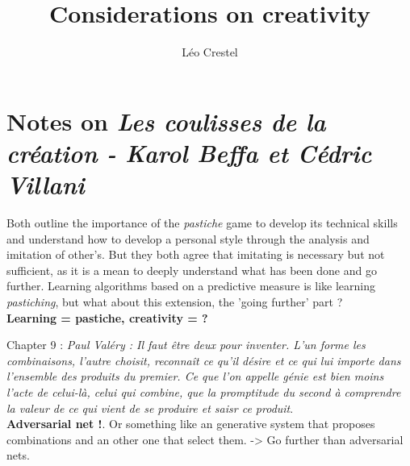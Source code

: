 \documentclass{report}
\title{Considerations on creativity}
\author{Léo Crestel}
\begin{document}
\maketitle

\section{Notes on \textit{Les coulisses de la création - Karol Beffa et Cédric Villani} \cite{Karol-Beffa:2015aa}}
Both outline the importance of the \textit{pastiche} game to develop its technical skills and understand how to develop a personal style through the analysis and imitation of other's.
But they both agree that imitating is necessary but not sufficient, as it is a mean to deeply understand what has been done and go further. Learning algorithms based on a predictive measure is like learning \textit{pastiching}, but what about this extension, the 'going further' part ?
\\
\textbf{ Learning = pastiche, creativity = ?}

Chapter 9 : \textit{Paul Valéry : Il faut être deux pour inventer. L'un forme les combinaisons, l'autre choisit, reconnaît ce qu'il désire et ce qui lui importe dans l'ensemble des produits du premier. Ce que l'on appelle génie est bien moins l'acte de celui-là, celui qui combine, que la promptitude du second à comprendre la valeur de ce qui vient de se produire et saisr ce produit}. \\
\textbf{Adversarial net !}. Or something like an generative system that proposes combinations and an other one that select them. -> Go further than adversarial nets.




\end{document}
